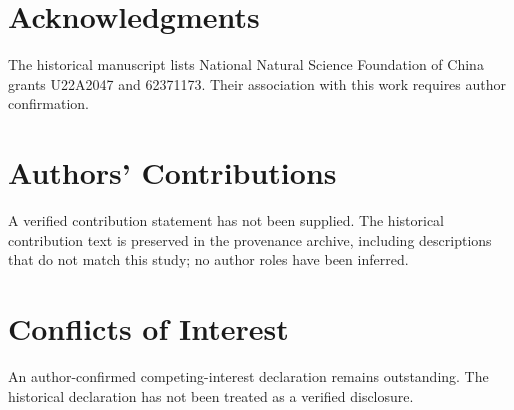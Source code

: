 \documentclass[journal]{IEEEtran}
\begin{document}
\section*{Acknowledgments}
The historical manuscript lists National Natural Science Foundation of China grants U22A2047 and 62371173. Their association with this work requires author confirmation.

\section*{Authors' Contributions}
A verified contribution statement has not been supplied. The historical contribution text is preserved in the provenance archive, including descriptions that do not match this study; no author roles have been inferred.

\section*{Conflicts of Interest}
An author-confirmed competing-interest declaration remains outstanding. The historical declaration has not been treated as a verified disclosure.




%
%
%
\end{document}
